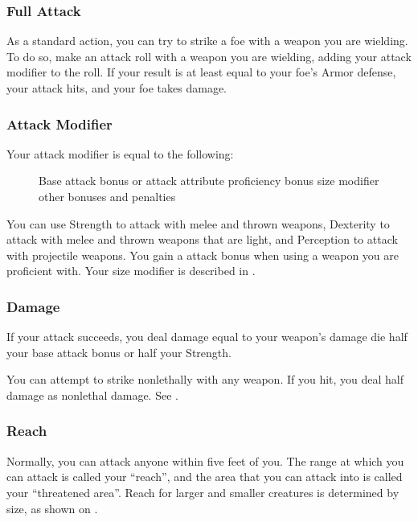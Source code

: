 \subsubsection{Full Attack}
As a standard action, you can try to strike a foe with a weapon you are wielding. To do so, make an attack roll with a weapon you are wielding, adding your attack modifier to the roll. If your result is at least equal to your foe's Armor defense, your attack hits, and your foe takes damage.

\subsubsection{Attack Modifier}
Your attack modifier is equal to the following:

\begin{figure}[h]
    \centering Base attack bonus or attack attribute \add proficiency bonus  \add size modifier \add other bonuses and penalties
\end{figure}

 You can use Strength to attack with melee and thrown weapons, Dexterity to attack with melee and thrown weapons that are light, and Perception to attack with projectile weapons. 
 You gain a  attack bonus when using a weapon you are proficient with.
 Your size modifier is described in .

\subsubsection{Damage}
If your attack succeeds, you deal damage equal to your weapon's damage die \add half your base attack bonus or half your Strength.

 You can attempt to strike nonlethally with any weapon. If you hit, you deal half damage as nonlethal damage. See .

\subsubsection{Reach}\label{Reach}
Normally, you can attack anyone within five feet of you. The range at which you can attack is called your ``reach'', and the area that you can attack into is called your ``threatened area''. Reach for larger and smaller creatures is determined by size, as shown on .

